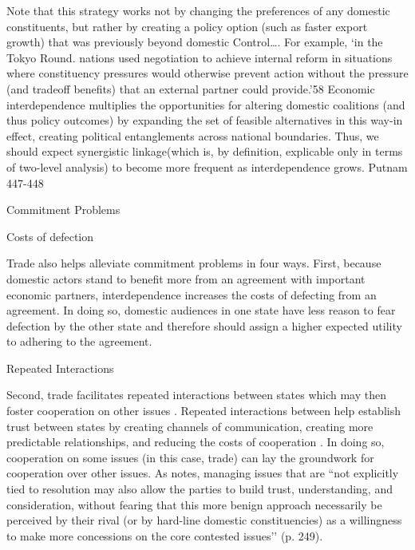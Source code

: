 	
	
	Note that this strategy works not by changing the preferences of any domestic constituents, but rather by creating a policy option (such as faster export growth) that was previously beyond domestic Control…. For example, ‘in the Tokyo Round. nations used negotiation to achieve internal reform in situations where constituency pressures would otherwise prevent action without the pressure (and tradeoff benefits) that an external partner could provide.'58 Economic interdependence multiplies the opportunities for altering domestic coalitions (and thus policy outcomes) by expanding the set of feasible alternatives in this way-in effect, creating political entanglements across national boundaries. Thus, we should expect synergistic linkage(which is, by definition, explicable only in terms of two-level analysis) to become more frequent as interdependence grows. Putnam 447-448
	
	Commitment Problems
	
	Costs of defection
	
	Trade also helps alleviate commitment problems in four ways. First, because domestic actors stand to benefit more from an agreement with important economic partners, interdependence increases the costs of defecting from an agreement. In doing so, domestic audiences in one state have less reason to fear defection by the other state and therefore should assign a higher expected utility to adhering to the agreement.
	
	Repeated Interactions
	
	Second, trade facilitates repeated interactions between states which may then foster cooperation on other issues \citep{lerner1956, rosecrance1986, russet1963}. Repeated interactions between help establish trust between states by creating channels of communication, creating more predictable relationships, and reducing the costs of cooperation \citep{axelrod1984, blum2007, gartzke2001, keohane2001, kydd2001, moravcsik1997, russett2001}. In doing so, cooperation on some issues (in this case, trade) can lay the groundwork for cooperation over other issues. As \citet{blum2007} notes, managing issues that are ``not explicitly tied to resolution may also allow the parties to build trust, understanding, and consideration, without fearing that this more benign approach necessarily be perceived by their rival (or by hard-line domestic constituencies) as a willingness to make more concessions on the core contested issues’’ (p. 249).
	
